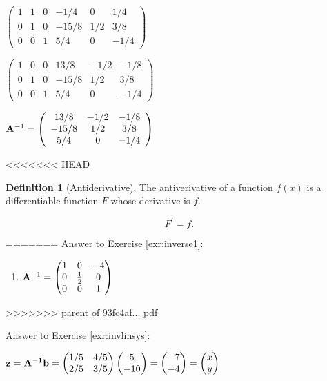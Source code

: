 \documentclass[]{book}
\providecommand{\tightlist}{%
  \setlength{\itemsep}{0pt}\setlength{\parskip}{0pt}}
\theoremstyle{definition}
\newtheorem{definition}{Definition}[chapter]
\theoremstyle{definition}
\theoremstyle{definition}
\theoremstyle{remark}
\begin{document}
\(\left(\begin{array}{ccc|ccc}  1&1&0&-1/4 &0 &1/4\\  0&1&0&-15/8&1/2&3/8\\  0&0&1&5/4 &0 &-1/4 \end{array} \right)\)

\(\left(\begin{array}{ccc|ccc}  1&0&0&13/8 &-1/2&-1/8\\  0&1&0&-15/8&1/2 &3/8\\  0&0&1&5/4 &0 &-1/4 \end{array} \right)\)

\({\bf A}^{-1} = \left(\begin{array}{ccc}  13/8 &-1/2&-1/8\\  -15/8&1/2 &3/8\\  5/4 &0 &-1/4 \end{array} \right)\)

<<<<<<< HEAD
\begin{definition}[Antiderivative]
\protect\hypertarget{def:unnamed-chunk-20}{}{\label{def:unnamed-chunk-20} {} }The antiverivative of a function \(f(x)\) is a differentiable function \(F\) whose derivative is \(f\).

\[F^\prime = f.\]
\end{definition}
=======
Answer to Exercise \ref{exr:inverse1}:

\begin{enumerate}
\def\labelenumi{\arabic{enumi}.}
\tightlist
\item
  \({\bf A}^{-1}=\begin{pmatrix} 1&0&-4\\0&\frac{1}{2}&0\\0&0&1 \end{pmatrix}\)
\end{enumerate}
>>>>>>> parent of 93fc4af... pdf

Answer to Exercise \ref{exr:invlinsys}:

\(\textbf{z} = \bf{A}^{-1} \bf{b} = \begin{pmatrix}  1/5 &4/5\\  2/5&3/5 \end{pmatrix} \begin{pmatrix}  5 \\  -10 \end{pmatrix}= \begin{pmatrix}  -7 \\  -4 \end{pmatrix} = \begin{pmatrix}  x \\  y \end{pmatrix}\)
\end{document}
